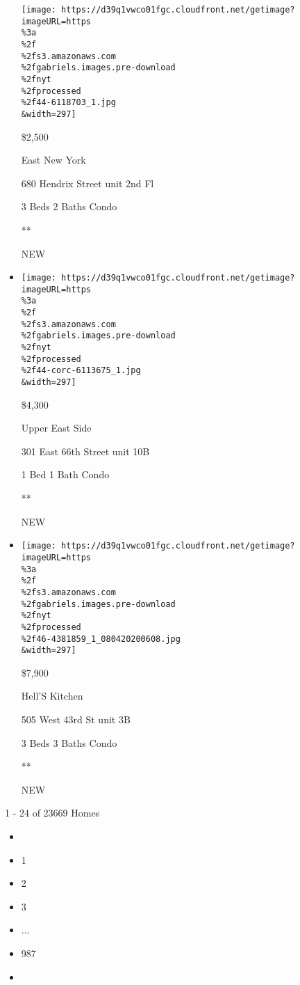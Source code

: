 \begin{itemize}
  \texttt{[image: https://d39q1vwco01fgc.cloudfront.net/getimage?imageURL=https\\\%3a\\\%2f\\\%2fs3.amazonaws.com\\\%2fgabriels.images.pre-download\\\%2fnyt\\\%2fprocessed\\\%2f44-6118703\_1.jpg\\\&width=297]}

  \$2,500

  East New York

  680 Hendrix Street unit 2nd Fl

  3 Beds \textbar{} 2 Baths \textbar{} Condo

  **

  NEW
\item
  \href{/real-estate/usa/ny/new-york/upper-east-side/homes-for-rent/301-east-66th-street/44-CORC-6113675?}{}

  \texttt{[image: https://d39q1vwco01fgc.cloudfront.net/getimage?imageURL=https\\\%3a\\\%2f\\\%2fs3.amazonaws.com\\\%2fgabriels.images.pre-download\\\%2fnyt\\\%2fprocessed\\\%2f44-corc-6113675\_1.jpg\\\&width=297]}

  \$4,300

  Upper East Side

  301 East 66th Street unit 10B

  1 Bed \textbar{} 1 Bath \textbar{} Condo

  **

  NEW
\item
  \href{/real-estate/usa/ny/new-york/hells-kitchen/homes-for-rent/505-west-43rd-st/46-4381859?}{}

  \texttt{[image: https://d39q1vwco01fgc.cloudfront.net/getimage?imageURL=https\\\%3a\\\%2f\\\%2fs3.amazonaws.com\\\%2fgabriels.images.pre-download\\\%2fnyt\\\%2fprocessed\\\%2f46-4381859\_1\_080420200608.jpg\\\&width=297]}

  \$7,900

  Hell'S Kitchen

  505 West 43rd St unit 3B

  3 Beds \textbar{} 3 Baths \textbar{} Condo

  **

  NEW
\end{itemize}

1 - 24 of 23669 Homes

\begin{itemize}
\item
\item
  1
\item
  2
\item
  3
\item
  ...
\item
  987
\item
\end{itemize}

